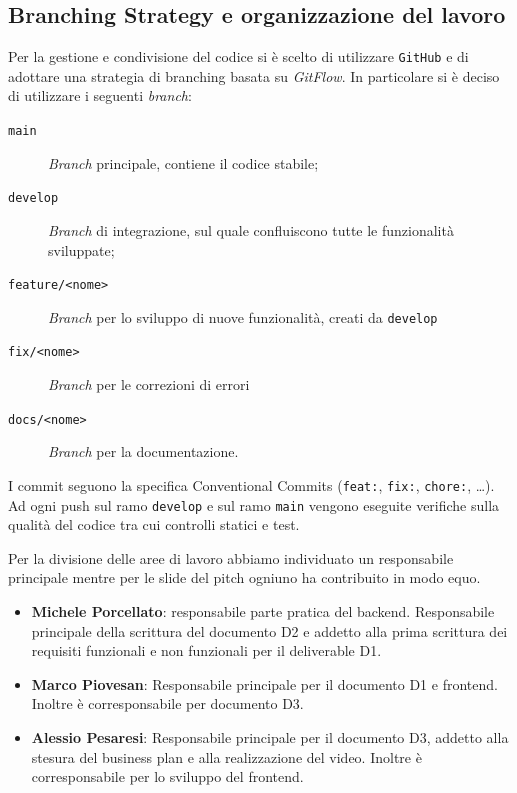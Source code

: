 \subsection{Branching Strategy e organizzazione del lavoro}
    Per la gestione e condivisione del codice si è scelto di utilizzare
    \texttt{GitHub} e di adottare una strategia di branching basata
    su \textit{GitFlow}. In particolare si è deciso di utilizzare i seguenti
    \textit{branch}:
    \begin{description}
        \item[\texttt{main}] \textit{Branch} principale, contiene il codice
        stabile;
        \item[\texttt{develop}] \textit{Branch} di integrazione, sul quale
        confluiscono tutte le funzionalità sviluppate;
        \item[\texttt{feature/<nome>}] \textit{Branch} per lo sviluppo di
        nuove funzionalità, creati da \texttt{develop}
        \item[\texttt{fix/<nome>}] \textit{Branch} per le correzioni
        di errori
        \item[\texttt{docs/<nome>}] \textit{Branch} per la documentazione.
    \end{description}
    I commit seguono la specifica Conventional Commits
    (\texttt{feat:}, \texttt{fix:}, \texttt{chore:}, \dots).
    Ad ogni push sul ramo \texttt{develop} e sul ramo \texttt{main} vengono eseguite verifiche sulla qualità del codice tra cui controlli statici e test.

    Per la divisione delle aree di lavoro abbiamo individuato un responsabile principale mentre per le slide del pitch ogniuno ha contribuito in modo equo.
    \begin{itemize}
        \item \textbf{Michele Porcellato}: responsabile parte pratica del backend. Responsabile principale della scrittura del documento D2 e addetto alla prima scrittura dei requisiti funzionali e non funzionali per il deliverable D1.
        \item \textbf{Marco Piovesan}: Responsabile principale per il documento D1 e frontend. Inoltre è corresponsabile per documento D3. 
        \item \textbf{Alessio Pesaresi}: Responsabile principale per il documento D3, addetto alla stesura del business plan e alla realizzazione del video. Inoltre è corresponsabile per lo sviluppo del frontend.
    \end{itemize}
    
